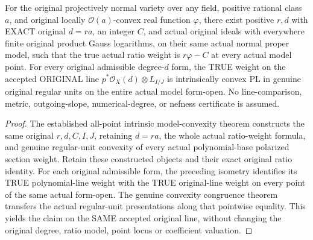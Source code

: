 \begin{theorem}
\label{local:actual-prescribed-class-original-model-intrinsic-convexity}
\leanok
{}
For the original projectively normal variety over any field, positive
rational class $a$, and original locally $\mathcal O(a)$-convex real function
$\varphi$, there exist positive $r,d$ with EXACT original $d=ra$, an integer
$C$, and actual original ideals with everywhere finite original product Gauss
logarithms, on their same actual normal proper model, such that the true actual
ratio weight is $r\varphi-C$ at every actual model point. For every original
admissible degree-$d$ form, the TRUE weight on the accepted ORIGINAL line
$p^*\mathcal O_X(d)\otimes L_{I/J}$ is intrinsically convex PL in genuine
original regular units on the entire actual model form-open. No line-comparison,
metric, outgoing-slope, numerical-degree, or nefness certificate is assumed.
\end{theorem}
\begin{proof}
The established all-point intrinsic model-convexity theorem constructs the
same original $r,d,C,I,J$, retaining $d=ra$, the whole actual ratio-weight
formula, and genuine regular-unit convexity of every actual polynomial-base
polarized section weight. Retain these constructed objects and their exact
original ratio identity. For each original admissible form, the preceding
isometry identifies its TRUE polynomial-line weight with the TRUE original-line
weight on every point of the same actual form-open. The genuine convexity
congruence theorem transfers the actual regular-unit presentations along that
pointwise equality. This yields the claim on the SAME accepted original line,
without changing the original degree, ratio model, point locus or coefficient
valuation.
\end{proof}
